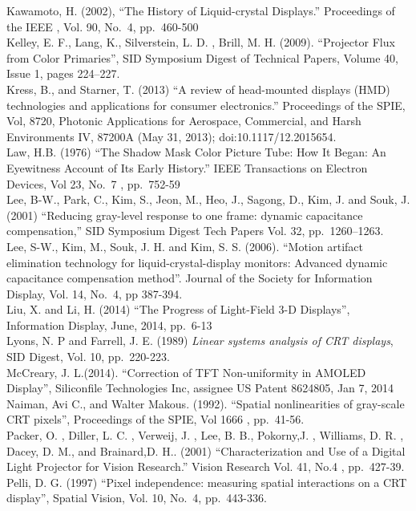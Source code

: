 \documentclass[
  letterpaper,
]{book}
\begin{document}
Kawamoto, H. (2002), ``The History of Liquid-crystal Displays.''
Proceedings of the IEEE , Vol. 90, No.~4, pp.~460-500\\
Kelley, E. F., Lang, K., Silverstein, L. D. , Brill, M. H. (2009).
``Projector Flux from Color Primaries'', SID Symposium Digest of
Technical Papers, Volume 40, Issue 1, pages 224--227.\\
Kress, B., and Starner, T. (2013) ``A review of head-mounted displays
(HMD) technologies and applications for consumer electronics.''
Proceedings of the SPIE, Vol, 8720, Photonic Applications for Aerospace,
Commercial, and Harsh Environments IV, 87200A (May 31, 2013);
doi:10.1117/12.2015654.\\
Law, H.B. (1976) ``The Shadow Mask Color Picture Tube: How It Began: An
Eyewitness Account of Its Early History.'' IEEE Transactions on Electron
Devices, Vol 23, No.~7 , pp.~752-59\\
Lee, B-W., Park, C., Kim, S., Jeon, M., Heo, J., Sagong, D., Kim, J. and
Souk, J. (2001) ``Reducing gray-level response to one frame: dynamic
capacitance compensation,'' SID Symposium Digest Tech Papers Vol. 32,
pp.~1260--1263.\\
Lee, S-W., Kim, M., Souk, J. H. and Kim, S. S. (2006). ``Motion artifact
elimination technology for liquid-crystal-display monitors: Advanced
dynamic capacitance compensation method''. Journal of the Society for
Information Display, Vol. 14, No.~4, pp 387-394.\\
Liu, X. and Li, H. (2014) ``The Progress of Light-Field 3-D Displays'',
Information Display, June, 2014, pp.~6-13\\
Lyons, N. P and Farrell, J. E. (1989) \emph{Linear systems analysis of
CRT displays}, SID Digest, Vol. 10, pp.~220-223.\\
McCreary, J. L.(2014). ``Correction of TFT Non-uniformity in AMOLED
Display'', Siliconfile Technologies Inc, assignee US Patent 8624805, Jan
7, 2014\\
Naiman, Avi C., and Walter Makous. (1992). ``Spatial nonlinearities of
gray-scale CRT pixels'', Proceedings of the SPIE, Vol 1666 ,
pp.~41-56.\\
Packer, O. , Diller, L. C. , Verweij, J. , Lee, B. B., Pokorny,J. ,
Williams, D. R. , Dacey, D. M., and Brainard,D. H.. (2001)
``Characterization and Use of a Digital Light Projector for Vision
Research.'' Vision Research Vol. 41, No.4 , pp.~427-39.\\
Pelli, D. G. (1997) ``Pixel independence: measuring spatial interactions
on a CRT display'', Spatial Vision, Vol. 10, No.~4, pp.~443-336.\\
\end{document}

